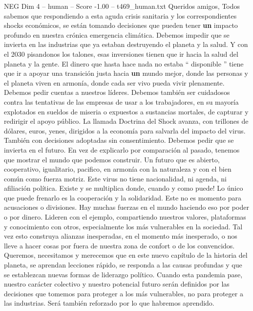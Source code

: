 \begin{textsample}{NEG Dim 4 – human – Score -1.00 – t469\_human.txt}  \label{ex:f4_neg_044}
Queridos amigos, Todos sabemos que respondiendo a esta aguda crisis sanitaria y los correspondientes shocks económicos, se están tomando decisiones que pueden tener \textbf{un} impacto profundo en nuestra crónica emergencia climática.
Debemos impedir que se invierta en las industrias que ya estaban destruyendo el planeta y la salud.
Y con el 2030 pisandonos los talones, esas inversiones tienen que ir hacia la salud del planeta y la gente.
El dinero que hasta hace nada no estaba “ disponible ” tiene que ir a apoyar una transición justa hacia \textbf{un} mundo mejor, donde las personas y el planeta viven en armonía, donde cada ser vivo pueda vivir plenamente.
Debemos pedir cuentas a nuestros líderes.
Debemos también ser cuidadosos contra las tentativas de las empresas de usar a los trabajadores, en su mayoría explotados en sueldos de miseria o expuestos a sustancias mortales, de capturar y redirigir el apoyo público.
La llamada Doctrina del Shock avanza, con trillones de dólares, euros, yenes, dirigidos a la economía para salvarla del impacto del virus.
También con decisiones adoptadas sin consentimiento.
Debemos pedir que se invierta en el futuro.
En vez de explicarlo por comparación al pasado, tenemos que mostrar el mundo que podemos construir.
Un futuro que es abierto, cooperativo, igualitario, pacifico, en armonía con la naturaleza y con el bien común como fuerza motriz.
Este virus no tiene nacionalidad, ni agenda, ni afiliación política.
Existe y se multiplica donde, cuando y como puede!
Lo único que puede frenarlo es la cooperación y la solidaridad.
Este no es momento para acusaciones o divisiones.
Hay muchas fuerzas en el mundo haciendo eso por poder o por dinero.
Lideren con el ejemplo, compartiendo nuestros valores, plataformas y conocimiento con otros, especialmente los más vulnerables en la sociedad.
Tal vez esto construya alianzas inesperadas, en el momento más inesperado, o nos lleve a hacer cosas por fuera de nuestra zona de confort o de los convencidos.
Queremos, necesitamos y merecemos que en este nuevo capítulo de la historia del planeta, se aprendan lecciones rápido, se responda a las causas profundas y que se establezcan nuevas formas de liderazgo político.
Cuando esta pandemia pase, nuestro carácter colectivo y nuestro potencial futuro serán definidos por las decisiones que tomemos para proteger a los más vulnerables, no para proteger a las industrias.
Será también reforzado por lo que habremos aprendido.

\end{textsample}
